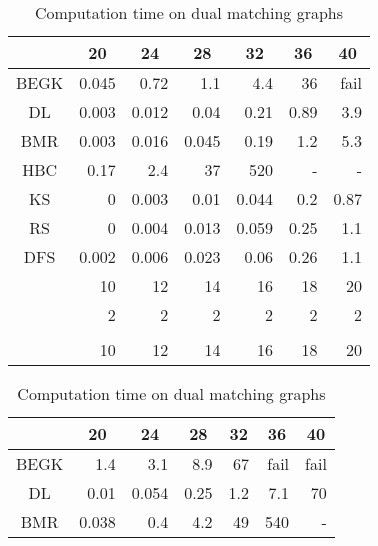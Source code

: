 \begin{table}
\begin{minipage}{177pt}
\begin{center}
\caption{Computation time on matching graphs}
\label{matching}
\begin{tabular}[c]{| r | r | r | r | r | r | r |}
\hline
\multicolumn{1}{|c||}{} & \multicolumn{1}{|c|}{20} & \multicolumn{1}{|c|}{24} & \multicolumn{1}{|c|}{28} & \multicolumn{1}{|c|}{32} & \multicolumn{1}{|c|}{36} & \multicolumn{1}{|c|}{40} \\\hline
\multicolumn{1}{|c||}{BEGK} &0.045&0.72&1.1&4.4&36&fail \\\hline
\multicolumn{1}{|c||}{DL} &0.003&0.012&0.04&0.21&0.89&3.9 \\\hline
\multicolumn{1}{|c||}{BMR} &0.003&0.016&0.045&0.19&1.2&5.3 \\\hline
\multicolumn{1}{|c||}{HBC} &0.17&2.4&37&520&-&- \\\hline
\multicolumn{1}{|c||}{KS} &0&0.003&0.01&0.044&0.2&0.87 \\\hline
\multicolumn{1}{|c||}{RS} &0 & 0.004 & 0.013 & 0.059 & 0.25 & 1.1\\\hline
\multicolumn{1}{|c||}{DFS} &0.002 & 0.006 & 0.023 & 0.06 & 0.26 & 1.1\\\hline
\hline
\multicolumn{1}{|c||}{} &10&12&14&16&18&20\\\hline
\multicolumn{1}{|c||}{} &2&2&2&2&2&2\\\hline
\multicolumn{1}{|c||}{} &&&&&&\\\hline
\multicolumn{1}{|c||}{} &10&12&14&16&18&20\\\hline
\end{tabular}
\end{center}
\end{minipage}
\begin{minipage}{167pt}
\begin{center}
\caption{Computation time on dual matching graphs}
\label{d_matching}
\begin{tabular}[c]{| r | r | r | r | r | r | r |}
\hline
\multicolumn{1}{|c||}{} & \multicolumn{1}{|c|}{20} & \multicolumn{1}{|c|}{24} & \multicolumn{1}{|c|}{28} & \multicolumn{1}{|c|}{32} & \multicolumn{1}{|c|}{36} & \multicolumn{1}{|c|}{40} \\\hline
\multicolumn{1}{|c||}{BEGK} & 1.4 & 3.1 & 8.9 & 67 & fail & fail\\\hline
\multicolumn{1}{|c||}{DL} & 0.01 & 0.054 & 0.25 & 1.2 & 7.1 & 70\\\hline
\multicolumn{1}{|c||}{BMR} & 0.038 & 0.4 & 4.2 & 49 & 540 & -\\\hline

\end{tabular}
\end{center}
\end{minipage}
\end{table}
